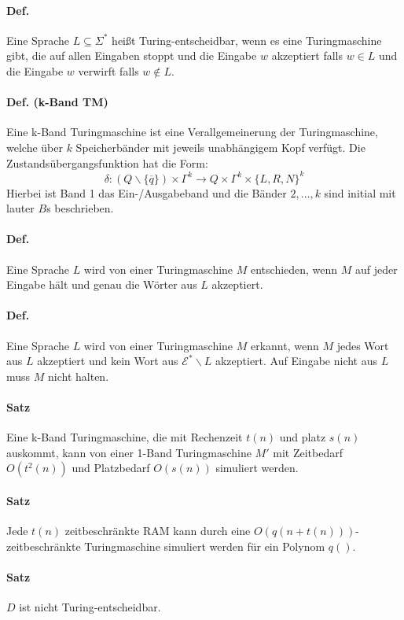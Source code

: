 \paragraph*{Def.} Eine Sprache $L \subseteq \Sigma^*$ heißt Turing-entscheidbar, wenn es eine Turingmaschine gibt, die auf allen Eingaben stoppt und die Eingabe $w$ akzeptiert falls $w \in L$ und die Eingabe $w$ verwirft falls $w \not\in L$.
\paragraph*{Def. (k-Band TM)} Eine k-Band Turingmaschine ist eine Verallgemeinerung der Turingmaschine, welche über $k$ Speicherbänder mit jeweils unabhängigem Kopf verfügt. Die Zustandsübergangsfunktion hat die Form: $$ \delta : (Q\backslash\{\overline{q}\}) \times \Gamma^k \rightarrow Q \times \Gamma^k \times \{L,R,N\}^k $$ Hierbei ist Band 1 das Ein-/Ausgabeband und die Bänder $2,\dots,k$ sind initial mit lauter $B$s beschrieben.
\paragraph*{Def.} Eine Sprache $L$ wird von einer Turingmaschine $M$ entschieden, wenn $M$ auf jeder Eingabe hält und genau die Wörter aus $L$ akzeptiert.
\paragraph*{Def.} Eine Sprache $L$ wird von einer Turingmaschine $M$ erkannt, wenn $M$ jedes Wort aus $L$ akzeptiert und kein Wort aus $\mathcal{E}^*\backslash L$ akzeptiert. Auf Eingabe nicht aus $L$ muss $M$ nicht halten.

\paragraph*{Satz} Eine k-Band Turingmaschine, die mit Rechenzeit $t(n)$ und platz $s(n)$ auskommt, kann von einer 1-Band Turingmaschine $M'$ mit Zeitbedarf $O(t^2(n))$ und Platzbedarf $O(s(n))$ simuliert werden.
\paragraph*{Satz} Jede $t(n)$ zeitbeschränkte RAM kann durch eine $O(q(n+t(n)))$-zeitbeschränkte Turingmaschine simuliert werden für ein Polynom $q()$.
\paragraph*{Satz} $D$ ist nicht Turing-entscheidbar.
